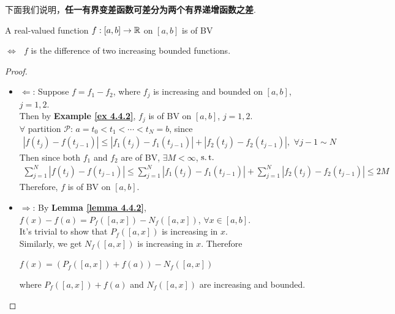 	\newpage
	下面我们说明，\textbf{任一有界变差函数可差分为两个有界递增函数之差}.
	\begin{thm}\label{thm 4.4.3}
		A real-valued function $f : [a , b] \rightarrow \mathbb{R}$ on $[a , b]$ is of BV
		\begin{center}
			$\Leftrightarrow \,\,$ $f$ is the difference of two increasing bounded functions.
		\end{center}
	
		\vspace{4em}
		\begin{proof}
			\begin{itemize}
				\item $\Leftarrow$: Suppose $f = f_1 - f_2$, where $f_j$ is increasing and bounded on $[a , b]$, $j = 1 , 2$. \\
				Then by \textbf{Example \ref{ex 4.4.2}}, $f_j$ is of BV on $[a , b]$, $j = 1 , 2$. \\
				$\forall$ partition $\mathcal{P}$: $a=  t_0 < t_1 < \cdots < t_N = b$, since
				\begin{align}
					\left| f(t_j) - f(t_{j - 1}) \right| 
					\leq \left| f_{1}(t_j) - f_{1}(t_{j - 1}) \right| + \left| f_{2}(t_j) - f_{2}(t_{j - 1}) \right| , \,\, \forall j - 1 \sim N
				\end{align}
				Then since both $f_1$ and $f_2$ are of BV, $\exists M < \infty$, $\operatorname{s.t.}$
				\begin{align}
					\sum_{j = 1}^{N}{\left| f(t_j) - f(t_{j - 1}) \right|}
					\leq \sum_{j = 1}^{N}{\left| f_{1}(t_j) - f_{1}(t_{j - 1}) \right|} + \sum_{j = 1}^{N}{\left| f_{2}(t_j) - f_{2}(t_{j - 1}) \right|}
					\leq 2M
				\end{align}
				Therefore, $f$ is of BV on $[a , b]$.
				
				\vspace{2em}
				
				\item $\Rightarrow$: By \textbf{Lemma \ref{lemma 4.4.2}}, $f(x) - f(a) = P_{f}([a , x]) - N_{f}([a , x])$, $\forall x \in [a , b]$. \\
				It's trivial to show that $P_{f}([a , x])$ is increasing in $x$. \\
				Similarly, we get $N_{f}([a , x])$ is increasing in $x$. Therefore
				\begin{center}
					$f(x) = \left( P_{f}([a , x]) + f(a) \right) - N_{f}([a , x])$
				\end{center}
				where $P_{f}([a , x]) + f(a)$ and $N_{f}([a , x])$ are increasing and bounded.
			\end{itemize}
		\end{proof}
	\end{thm}

